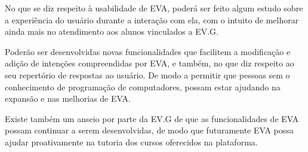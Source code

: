 No que se diz respeito à usabilidade de EVA, poderá ser feito algum estudo sobre a experiência do usuário durante a interação com ela, com o intuito de melhorar ainda mais no atendimento aos alunos vinculados a EV.G. 

Poderão ser desenvolvidas novas funcionalidades que facilitem a modificação e adição de intenções compreendidas por EVA, e também, no que diz respeito ao seu repertório de respostas ao usuário. De modo a permitir que pessoas sem o conhecimento de programação de computadores, possam estar ajudando na expansão e nas melhorias de EVA.

Existe também um anseio por parte da EV.G de que as funcionalidades de EVA possam continuar a serem desenvolvidas, de modo que futuramente EVA possa ajudar proativamente na tutoria dos cursos oferecidos na plataforma. 